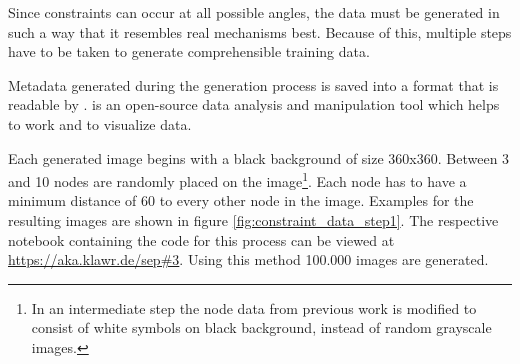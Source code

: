 Since constraints can occur at all possible angles, the data must be generated in such a way that it resembles real mechanisms best.
Because of this, multiple steps have to be taken to generate comprehensible training data.

Metadata generated during the generation process is saved into a format that is readable by . %
 is an open-source data analysis and manipulation tool which helps to work and to visualize data.

Each generated image begins with a black background of size 360x360.
Between 3 and 10 nodes are randomly placed on the image\footnote{In an intermediate step the node data from previous work is modified to consist of white symbols on black background, instead of random grayscale images.}.
Each node has to have a minimum distance of 60 to every other node in the image.
Examples for the resulting images are shown in figure \ref{fig:constraint_data_step1}.
The respective notebook containing the code for this process can be viewed at \url{https://aka.klawr.de/sep\#3}.
Using this method 100.000 images are generated.

